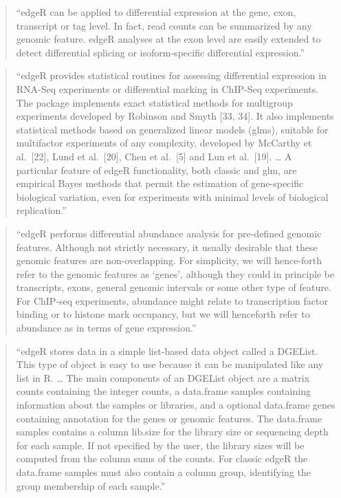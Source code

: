 \documentclass[]{tufte-book}
\begin{document}
\begin{quote}
``edgeR can be applied to differential expression at the gene, exon, transcript
or tag level. In fact, read counts can be summarized by any genomic feature.
edgeR analyses at the exon level are easily extended to detect differential
splicing or isoform-specific differential expression.'' \citep{chen2014edger}
\end{quote}

\begin{quote}
``edgeR provides statistical routines for assessing differential expression in
RNA-Seq experiments or differential marking in ChIP-Seq experiments. The package
implements exact statistical methods for multigroup experiments developed by
Robinson and Smyth {[}33, 34{]}. It also implements statistical methods based on
generalized linear models (glms), suitable for multifactor experiments of any
complexity, developed by McCarthy et al.~{[}22{]}, Lund et al.~{[}20{]}, Chen et al.~{[}5{]}
and Lun et al.~{[}19{]}. \ldots{} A particular feature of edgeR functionality, both
classic and glm, are empirical Bayes methods that permit the estimation of
gene-specific biological variation, even for experiments with minimal levels of
biological replication.'' \citep{chen2014edger}
\end{quote}

\begin{quote}
``edgeR performs differential abundance analysis for pre-defined genomic
features. Although not strictly necessary, it usually desirable that these
genomic features are non-overlapping. For simplicity, we will hence-forth refer
to the genomic features as `genes', although they could in principle be
transcripts, exons, general genomic intervals or some other type of feature. For
ChIP-seq experiments, abundance might relate to transcription factor binding or
to histone mark occupancy, but we will henceforth refer to abundance as in terms
of gene expression.'' \citep{chen2014edger}
\end{quote}

\begin{quote}
``edgeR stores data in a simple list-based data object called a DGEList. This
type of object is easy to use because it can be manipulated like any list in R.
\ldots{} The main components of an DGEList object are a matrix counts containing the
integer counts, a data.frame samples containing information about the samples or
libraries, and a optional data.frame genes containing annotation for the genes
or genomic features. The data.frame samples contains a column lib.size for the
library size or sequencing depth for each sample. If not specified by the user,
the library sizes will be computed from the column sums of the counts. For
classic edgeR the data.frame samples must also contain a column group,
identifying the group membership of each sample.'' \citep{chen2014edger}
\end{quote}
\end{document}
